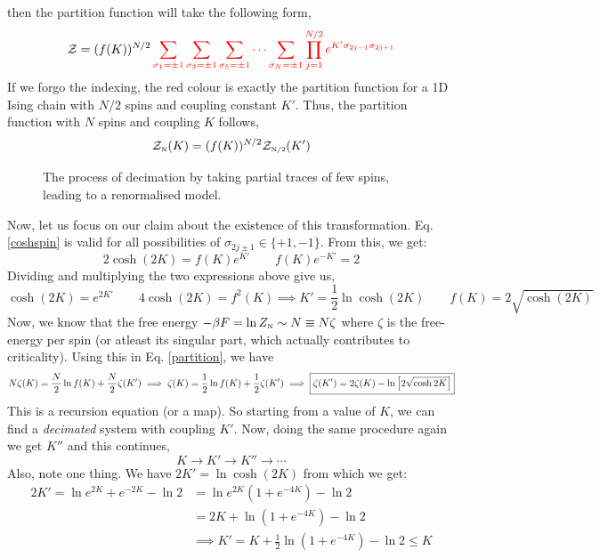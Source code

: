 then the partition function will take the following form, 
\begin{align}
        \SZ =(f(K))^{N/2} \mathcolor{red}{\sum\limits_{\sigma_1 = \pm 1}\sum\limits_{\sigma_3 = \pm 1}\sum\limits_{\sigma_5 = \pm 1}\cdots \sum\limits_{\sigma_N = \pm 1} \prod\limits_{j=1}^{N/2}  e^{K'\sigma_{2j-1}\sigma_{2j+1}}}
\end{align}
If we forgo the indexing, the red colour is exactly the partition function for a 1D Ising chain with $N/2$ spins and coupling constant $K'$. Thus, the partition function with $N$ spins and coupling $K$ follows, 
\begin{equation}\label{partition}
    \mathcal Z_{\text{\tiny N}}(K) = (f(K))^{N/2} \mathcal Z_{\text{\tiny N/2}}(K')
\end{equation}
\begin{figure}[H]
    \centering 
    
    \caption{The process of decimation by taking partial traces of few spins, leading to a renormalised model.}
    \label{decimationfig}
\end{figure}
\noindent
Now, let us focus on our claim about the existence of this transformation. Eq. \eqref{coshspin} is valid for all possibilities of $\sigma_{2j\pm 1} \in \{+1,-1\}$. From this, we get:
$$2\cosh(2K) = f(K)e^{K'}\qquad f(K)e^{-K'}=2$$
Dividing and multiplying the two expressions above give us,
$$\cosh(2K) = e^{2K'} \qquad 4\cosh(2K)= f^2(K) \implies K' = \frac{1}{2}\ln \cosh (2K)\qquad f(K) = 2\sqrt{\cosh (2K)}$$
Now, we know that the free energy $-\beta F = \ln Z_{\text{\tiny N}} \sim N \equiv N\zeta$ where $\zeta$ is the free-energy per spin (or atleast its singular part, which actually contributes to criticality). Using this in Eq. \eqref{partition}, we have 
\begin{align}\label{recRG}
    N\zeta(K) = \frac{N}{2}\ln f(K) + \frac{N}{2}\zeta(K') \implies \zeta(K) = \frac{1}{2}\ln f(K) + \frac{1}{2}\zeta(K') \implies \boxed{\zeta(K') = 2\zeta(K) - \ln \qty[2\sqrt{\cosh 2K}]}
\end{align}
This is a recursion equation (or a map). So starting from a value of $K$, we can find a \textit{decimated} system with coupling $K'$. Now, doing the same procedure again we get $K''$ and this continues, 
$$K \rightarrow K' \rightarrow K'' \rightarrow \cdots$$
Also, note one thing. We have $2K'= \ln \cosh(2K)  $ from which we get: 
\begin{align*}
    2K' = \ln e^{2K}+e^{-2K} - \ln 2 &= \ln e^{2K}(1+e^{-4K}) -\ln 2 \\ &= 2K + \ln (1+e^{-4K}) - \ln 2 \\ &\implies K' = K +\frac{1}{2}\ln (1+e^{-4K}) - \ln 2 \leq K
\end{align*}

